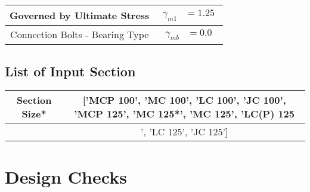 \documentclass{article}%
\begin{document}
\begin{longtable}{|p{5cm}|p{2cm}|p{2cm}|p{2cm}|p{5cm}|}
\hline%
\hline%
\multicolumn{3}{|c|}{Governed by Ultimate Stress}&\multicolumn{2}{|c|}{$\begin{aligned}\gamma_{m1}&=1.25\end{aligned}$}\\%
\hline%
\hline%
\multicolumn{3}{|c|}{Connection Bolts {-} Bearing Type}&\multicolumn{2}{|c|}{$\begin{aligned}\gamma_{mb}&=0.0\end{aligned}$}\\%
\hline%
\end{longtable}%
\subsection{List of Input Section}%
\label{subsec:ListofInputSection}%
\renewcommand{\arraystretch}{1.2}%
\begin{longtable}{|p{8cm}|p{8cm}|}%
\hline%
\multicolumn{1}{|c|}{Section Size*}&\multicolumn{1}{|c|}{{[}'MCP 100', 'MC 100', 'LC 100', 'JC 100', 'MCP 125', 'MC 125*', 'MC 125', 'LC(P) 125}\\%
\hline%
\hline%
\multicolumn{1}{|c|}{ }&\multicolumn{1}{|c|}{', 'LC 125', 'JC 125'{]}}\\%
\hline%
\end{longtable}

%
%
\newpage%
\section{Design Checks}%
\label{sec:DesignChecks}%
\end{document}
